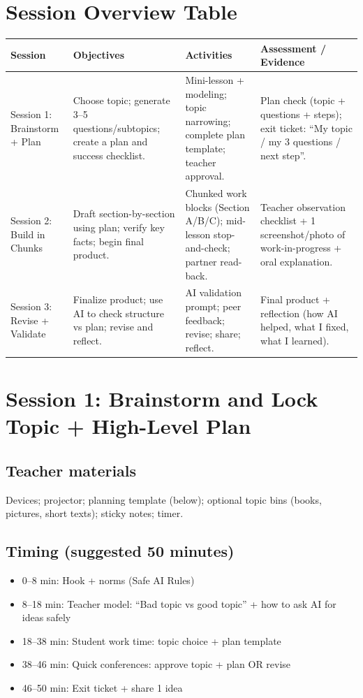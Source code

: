 \documentclass[11pt]{article}
\newcommand{\Session}[1]{\section*{#1}}
\newcommand{\Sub}[1]{\subsection*{#1}}
\begin{document}
\Session{Session Overview Table}
\begin{center}
\begin{tabularx}{\textwidth}{@{}p{2.8cm}YYY@{}}
\toprule
\textbf{Session} & \textbf{Objectives} & \textbf{Activities} & \textbf{Assessment / Evidence} \\
\midrule
Session 1: Brainstorm + Plan &
Choose topic; generate 3--5 questions/subtopics; create a plan and success checklist. &
Mini-lesson + modeling; topic narrowing; complete plan template; teacher approval. &
Plan check (topic + questions + steps); exit ticket: ``My topic / my 3 questions / next step''. \\
\addlinespace
Session 2: Build in Chunks &
Draft section-by-section using plan; verify key facts; begin final product. &
Chunked work blocks (Section A/B/C); mid-lesson stop-and-check; partner read-back. &
Teacher observation checklist + 1 screenshot/photo of work-in-progress + oral explanation. \\
\addlinespace
Session 3: Revise + Validate &
Finalize product; use AI to check structure vs plan; revise and reflect. &
AI validation prompt; peer feedback; revise; share; reflect. &
Final product + reflection (how AI helped, what I fixed, what I learned). \\
\bottomrule
\end{tabularx}
\end{center}

\Session{Session 1: Brainstorm and Lock Topic + High-Level Plan}
\Sub{Teacher materials}
Devices; projector; planning template (below); optional topic bins (books, pictures, short texts); sticky notes; timer.

\Sub{Timing (suggested 50 minutes)}
\begin{itemize}[leftmargin=*]
  \item 0--8 min: Hook + norms (Safe AI Rules)
  \item 8--18 min: Teacher model: ``Bad topic vs good topic'' + how to ask AI for ideas safely
  \item 18--38 min: Student work time: topic choice + plan template
  \item 38--46 min: Quick conferences: approve topic + plan OR revise
  \item 46--50 min: Exit ticket + share 1 idea
\end{itemize}
\end{document}
